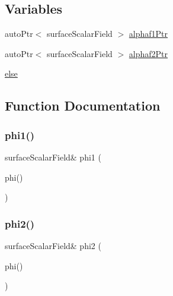 \subsection*{Variables}
\begin{DoxyCompactItemize}
\item 
auto\+Ptr$<$ surface\+Scalar\+Field $>$ \hyperlink{refsAndControls__2p_8H_af3c259085af2100505920007f2efd8d5}{alphaf1\+Ptr}
\item 
auto\+Ptr$<$ surface\+Scalar\+Field $>$ \hyperlink{refsAndControls__2p_8H_ac8b93dc9a33a53440d41ca437c0a03c9}{alphaf2\+Ptr}
\item 
\hyperlink{refsAndControls__2p_8H_a0544c3fe466e421738dae463968b70ba}{else}
\end{DoxyCompactItemize}


\subsection{Function Documentation}
\mbox{\label{refsAndControls__2p_8H_aaf6a6a2ee3cff53881bc1adab47f2a9a}} 
\subsubsection{\texorpdfstring{phi1()}{phi1()}}
{\footnotesize\ttfamily surface\+Scalar\+Field\& phi1 (\begin{DoxyParamCaption}\item[{fluid1\+\_\+.}]{phi() }\end{DoxyParamCaption})}

\mbox{\label{refsAndControls__2p_8H_adb57687d5d74249f550cb14883eebe4d}} 
\subsubsection{\texorpdfstring{phi2()}{phi2()}}
{\footnotesize\ttfamily surface\+Scalar\+Field\& phi2 (\begin{DoxyParamCaption}\item[{fluid2\+\_\+.}]{phi() }\end{DoxyParamCaption})}

